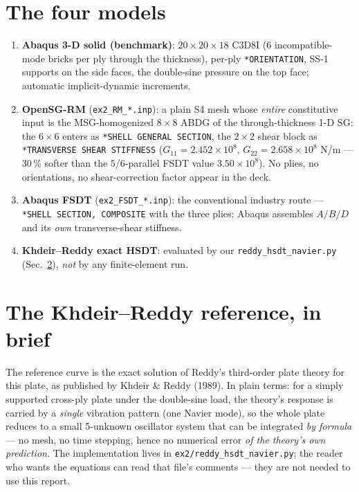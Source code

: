 \documentclass[11pt]{article}
\newcommand{\code}[1]{\texttt{#1}}
\begin{document}
\section{The four models}
\begin{enumerate}
\item \textbf{Abaqus 3-D solid (benchmark)}: $20\times20\times18$ C3D8I
  (6 incompatible-mode bricks per ply through the thickness), per-ply
  \code{*ORIENTATION}, SS-1 supports on the side faces, the double-sine
  pressure on the top face; automatic implicit-dynamic increments.
\item \textbf{OpenSG-RM} (\code{ex2\_RM\_*.inp}): a plain S4 mesh whose
  \emph{entire} constitutive input is the MSG-homogenized $8\times8$ ABDG
  of the through-thickness 1-D SG: the $6\times6$ enters as \code{*SHELL
  GENERAL SECTION}, the $2\times2$ shear block as \code{*TRANSVERSE SHEAR
  STIFFNESS} ($G_{11}=2.452\times10^{8}$, $G_{22}=2.658\times10^{8}$ N/m
  --- 30\,\% softer than the $5/6$-parallel FSDT value $3.50\times10^{8}$).
  No plies, no orientations, no shear-correction factor appear in the deck.
\item \textbf{Abaqus FSDT} (\code{ex2\_FSDT\_*.inp}): the conventional
  industry route --- \code{*SHELL SECTION, COMPOSITE} with the three plies;
  Abaqus assembles $A/B/D$ and its \emph{own} transverse-shear stiffness.
\item \textbf{Khdeir--Reddy exact HSDT}: evaluated by our
  \code{reddy\_hsdt\_navier.py} (Sec.~\ref{sec:kr}), \emph{not} by any
  finite-element run.
\end{enumerate}

\section{The Khdeir--Reddy reference, in brief}
\label{sec:kr}
The reference curve is the exact solution of Reddy's third-order plate
theory for this plate, as published by Khdeir \& Reddy (1989).  In plain
terms: for a simply supported cross-ply plate under the double-sine load,
the theory's response is carried by a \emph{single} vibration pattern
(one Navier mode), so the whole plate reduces to a small 5-unknown
oscillator system that can be integrated \emph{by formula} --- no mesh, no
time stepping, hence no numerical error \emph{of the theory's own
prediction}.  The implementation lives in
\code{ex2/reddy\_hsdt\_navier.py}; the reader who wants the equations can
read that file's comments --- they are not needed to use this report.
\end{document}
